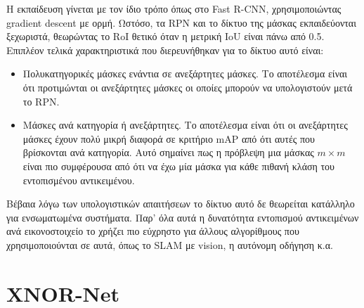 Η εκπαίδευση γίνεται με τον ίδιο τρόπο όπως στο Fast R-CNN, χρησιμοποιώντας gradient descent με ορμή. Ωστόσο, τα RPN και το δίκτυο της μάσκας εκπαιδεύονται ξεχωριστά, θεωρώντας το RoI θετικό όταν η μετρική IoU είναι πάνω από 0.5. Επιπλέον τελικά χαρακτηριστικά που διερευνήθηκαν για το δίκτυο αυτό είναι:
\begin{itemize}
  \item Πολυκατηγορικές μάσκες ενάντια σε ανεξάρτητες μάσκες. Το αποτέλεσμα είναι ότι προτιμώνται οι ανεξάρτητες μάσκες οι οποίες μπορούν να υπολογιστούν μετά το RPN.
  \item Μάσκες ανά κατηγορία ή ανεξάρτητες. Το αποτέλεσμα είναι ότι οι ανεξάρτητες μάσκες έχουν πολύ μικρή διαφορά σε κριτήριο mAP από ότι αυτές που βρίσκονται ανά κατηγορία. Αυτό σημαίνει πως η πρόβλεψη μια μάσκας $ m \times m $ είναι πιο συμφέρουσα από ότι να έχω μία μάσκα για κάθε πιθανή κλάση του εντοπισμένου αντικειμένου.
\end{itemize}

Βέβαια λόγω των υπολογιστικών απαιτήσεων το δίκτυο αυτό δε θεωρείται κατάλληλο για ενσωματωμένα συστήματα. Παρ' όλα αυτά η δυνατότητα εντοπισμού αντικειμένων ανά εικονοστοιχείο το χρήζει πιο εύχρηστο για άλλους αλγορίθμους που χρησιμοποιούνται σε αυτά, όπως το SLAM με vision, η αυτόνομη οδήγηση κ.α. 






\section{XNOR-Net \cite{18}}

